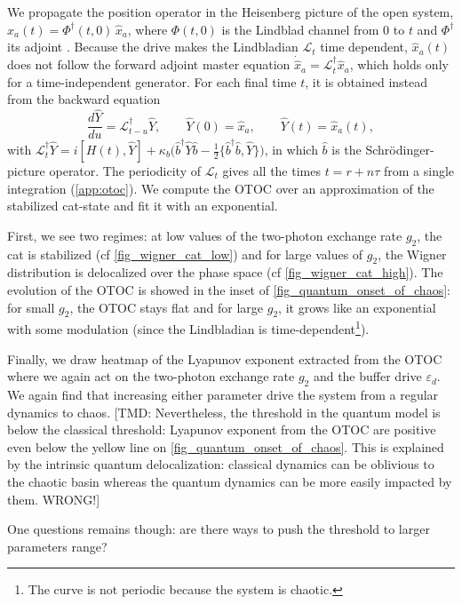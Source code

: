 \documentclass[aps,prx,reprint,floatfix,amsmath,amssymb,longbibliography]{revtex4-2}
\newcommand{\eps}{\varepsilon}
\newcommand{\da}{^\dagger}
\newcommand{\TMD}[1]{{\color{Blue} [TMD: {#1}]}}
\begin{document}
We propagate the position operator in the Heisenberg picture of the open system, $\hat x_a(t)=\Phi^\dagger(t,0)\,\hat x_a$, where $\Phi(t,0)$ is the Lindblad channel from $0$ to $t$ and $\Phi^\dagger$ its adjoint \cite[p.~125]{Breuer2006Jan}. Because the drive makes the Lindbladian $\mathcal L_t$ time dependent, $\hat x_a(t)$ does not follow the forward adjoint master equation $\dot{\hat x}_a=\mathcal L_t^\dagger\hat x_a$, which holds only for a time-independent generator. For each final time $t$, it is obtained instead from the backward equation
\begin{equation}
    \frac{d\hat Y}{du}=\mathcal L^\dagger_{t-u}\hat Y,\qquad \hat Y(0)=\hat x_a,\qquad \hat Y(t)=\hat x_a(t),
    \label{eq_otoc_backward}
\end{equation}
with $\mathcal L_t^\dagger\hat Y=i[H(t),\hat Y]+\kappa_b\bigl(\hat b\da\hat Y\hat b-\tfrac12\{\hat b\da\hat b,\hat Y\}\bigr)$, in which $\hat b$ is the Schrödinger-picture operator. The periodicity of $\mathcal L_t$ gives all the times $t=r+n\tau$ from a single integration (\cref{app:otoc}). We compute the OTOC over an approximation of the stabilized cat-state and fit it with an exponential.

 First, we see two regimes: at low values of the two-photon exchange rate $g_2$, the cat is stabilized (cf \cref{fig_wigner_cat_low}) and for large values of $g_2$, the Wigner distribution is delocalized over the phase space (cf \cref{fig_wigner_cat_high}). The evolution of the OTOC is showed in the inset of \cref{fig_quantum_onset_of_chaos}: for small $g_2$, the OTOC stays flat and for large $g_2$, it grows like an exponential with some modulation (since the Lindbladian is time-dependent\footnote{The curve is not periodic because the system is chaotic.}). 

Finally, we draw heatmap of the Lyapunov exponent extracted from the OTOC where we again act on the two-photon exchange rate $g_2$ and the buffer drive $\eps_d$. We again find that increasing either parameter drive the system from a regular dynamics to chaos. \TMD{ Nevertheless, the threshold in the quantum model is below the classical threshold: Lyapunov exponent from the OTOC are positive even below the yellow line on \cref{fig_quantum_onset_of_chaos}. This is explained by the intrinsic quantum delocalization: classical dynamics can be oblivious to the chaotic basin whereas the quantum dynamics can be more easily impacted by them. WRONG!}

One questions remains though: are there ways to push the threshold to larger parameters range?
\end{document}

